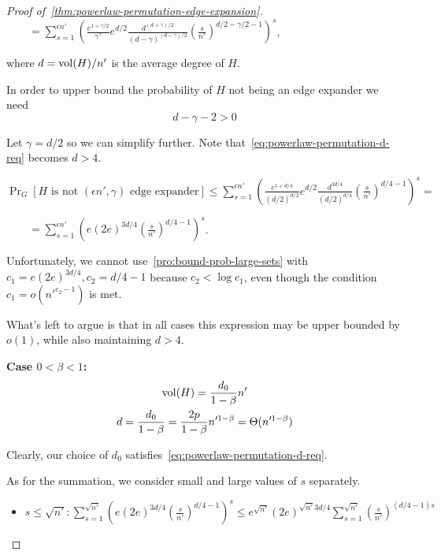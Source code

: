 \begin{proof}[Proof of~\autoref{thm:powerlaw-permutation-edge-expansion}]
    $\qquad=\sum_{s=1}^{\epsilon n'}{\left(
        \frac{e^{1+\gamma/2}}{\gamma^\gamma}
        e^{d/2}
        \frac{d^{(d+\gamma)/2}}{(d-\gamma)^{(d-\gamma)/2}}
        \left(\frac{s}{n'}\right)^{d/2-\gamma/2-1}
    \right)^s}$,
    
    where $d=\operatorname*{vol}(H)/n'$ is the average degree of $H$.
    
    In order to upper bound the probability of $H$ not being an edge expander we need
    \begin{equation}
        \label{eq:powerlaw-permutation-d-req}
        d-\gamma-2>0
    \end{equation}
    
    Let $\gamma=d/2$ so we can simplify further.
    Note that~\eqref{eq:powerlaw-permutation-d-req} becomes $d>4$.
    
    $\Pr_G[H\text{ is not }(\epsilon n',\gamma)\text{ edge expander}]\leq\sum_{s=1}^{\epsilon n'}{\left(
        \frac{e^{1+d/4}}{(d/2)^{d/2}}
        e^{d/2}
        \frac{d^{3d/4}}{(d/2)^{d/4}}
        \left(\frac{s}{n'}\right)^{d/4-1}
    \right)^s}=$
    
    $\qquad=\sum_{s=1}^{\epsilon n'}{\left(
        e
        (2e)^{3d/4}
        \left(\frac{s}{n'}\right)^{d/4-1}
    \right)^s}$.

    Unfortunately, we cannot use~\autoref{pro:bound-prob-large-sets}
    with $c_1=e(2e)^{3d/4},c_2=d/4-1$ because $c_2<\log c_1$,
    even though the condition $c_1=o\left(n'^{c_2-1}\right)$ is met.

    What's left to argue is that in all cases this expression may be upper bounded by $o(1)$, while also maintaining $d>4$.
    
    \textbf{Case $0<\beta<1$:}
    \begin{gather*}
        \operatorname*{vol}(H)=\frac{d_0}{1-\beta}n'\\
        d=\frac{d_0}{1-\beta}=\frac{2p}{1-\beta}n'^{1-\beta}=\Theta(n'^{1-\beta})
    \end{gather*}
    
    Clearly, our choice of $d_0$ satisfies~\eqref{eq:powerlaw-permutation-d-req}.

    As for the summation, we consider small and large values of $s$ separately.
    \begin{itemize}
        \item $s\leq\sqrt{n'}:
        \sum_{s=1}^{\sqrt{n'}}{\left(
            e
            (2e)^{3d/4}
            \left(\frac{s}{n'}\right)^{d/4-1}
        \right)^s}
        \leq e^{\sqrt{n'}}(2e)^{\sqrt{n'}3d/4}\sum_{s=1}^{\sqrt{n'}}{
            \left(\frac{s}{n'}\right)^{(d/4-1)s}
        }$
    

\end{itemize}
\end{proof}
